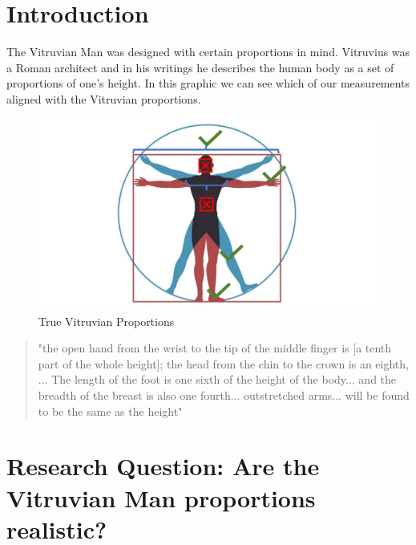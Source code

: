 \documentclass[]{article}
\begin{document}
\vskip -8.5pt




\noindent  

\section{Introduction}
\label{sec:intro}

The Vitruvian Man was designed with certain proportions in mind.
Vitruvius was a Roman architect and in his writings he describes the
human body as a set of proportions of one's height. In this graphic we
can see which of our measurements aligned with the Vitruvian
proportions.

\begin{figure}[!ht]
    \centering
            \includegraphics[clip,scale=0.4]{figures/one_graphic.pdf}
        \caption{ True Vitruvian Proportions}
        \label{fig:one-graphic}
\end{figure}

\begin{quote}
"the open hand from the wrist to the tip of the middle finger is [a tenth part of the whole height]; the head from the chin to the crown is an eighth, ... The length of the foot is one sixth of the height of the body... and the breadth of the breast is also one fourth... outstretched arms... will be found to be the same as the height"
\end{quote}

\citep{Vitruvius}

\section{Research Question:  Are the Vitruvian Man proportions realistic?}
\label{sec:rq}
\end{document}
